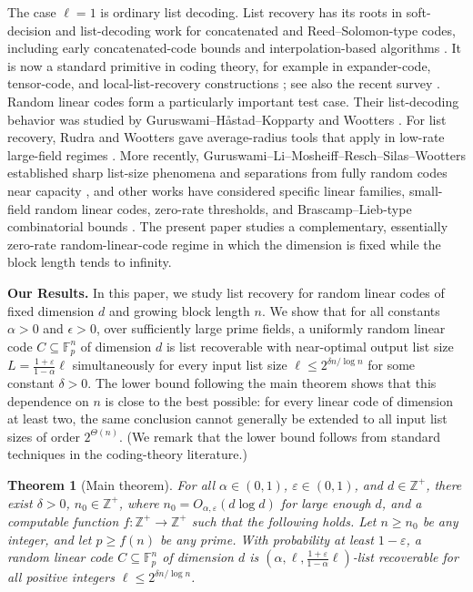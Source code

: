 \documentclass[10pt,a4paper]{amsart}
\newtheorem{theorem}{Theorem}
\newcommand{\Fp}{\mathbb{F}_p}
\begin{document}
The case $\ell=1$ is ordinary list decoding. List recovery has its roots in soft-decision and list-decoding work for concatenated and Reed--Solomon-type codes, including early concatenated-code bounds and interpolation-based algorithms \cite{ZyablovPinsker,GuruswamiSudan}. It is now a standard primitive in coding theory, for example in expander-code, tensor-code, and local-list-recovery constructions \cite{HemenwayRonZewiWootters}; see also the recent survey \cite{ReschVenkitesh}. Random linear codes form a particularly important test case. Their list-decoding behavior was studied by Guruswami--H\aa stad--Kopparty and Wootters \cite{GuruswamiHastadKopparty,Wootters}. For list recovery, Rudra and Wootters gave average-radius tools that apply in low-rate large-field regimes \cite{RudraWootters}. More recently, Guruswami--Li--Mosheiff--Resch--Silas--Wootters established sharp list-size phenomena and separations from fully random codes near capacity \cite{GLMRSW}, and other works have considered specific linear families, small-field random linear codes, zero-rate thresholds, and Brascamp--Lieb-type combinatorial bounds \cite{LiShagrithaya,DoronMosheiffReschRibeiro,ReschYuanZhang,BrakensiekChenDharZhang}. The present paper studies a complementary, essentially zero-rate random-linear-code regime in which the dimension is fixed while the block length tends to infinity.

\textbf{Our Results.}
In this paper, we study list recovery for random linear codes of fixed dimension $d$ and growing block length $n$. We show that for all constants $\alpha>0$ and $\epsilon>0$, over sufficiently large prime fields, a uniformly random linear code $C \subseteq \Fp^n$ of dimension $d$ is list recoverable with near-optimal output list size $L=\frac{1+\varepsilon}{1-\alpha}\ell$ simultaneously for every input list size $\ell\le 2^{\delta n/\log n}$ for some constant $\delta>0$. The lower bound following the main theorem shows that this dependence on $n$ is close to the best possible: for every linear code of dimension at least two, the same conclusion cannot generally be extended to all
input list sizes of order $2^{\Theta(n)}$. (We remark that the lower bound follows from standard techniques in the coding-theory literature.)


\begin{theorem}[Main theorem]\label{thm:main}
    For all $\alpha \in (0,1)$, $\varepsilon \in (0,1)$, and $d \in \mathbb{Z}^+$, there exist $\delta > 0$, $n_0 \in \mathbb{Z}^+$, where 
$n_0=O_{\alpha,\varepsilon}(d\log d)$ for large enough $d$, and a computable function $f : \mathbb{Z}^+ \rightarrow \mathbb{Z}^+$ such that the following holds. Let $n \geq n_0$ be any integer, and let $p \geq f(n)$ be any prime. With probability at least $1 - \varepsilon$, a random linear code $C \subseteq \Fp^n$ of dimension $d$ is $(\alpha, \ell, \frac{1+\varepsilon}{1-\alpha}\ell)$-list recoverable for all positive integers $\ell \leq 2^{\delta n/\log n}$.
\end{theorem}
\end{document}
